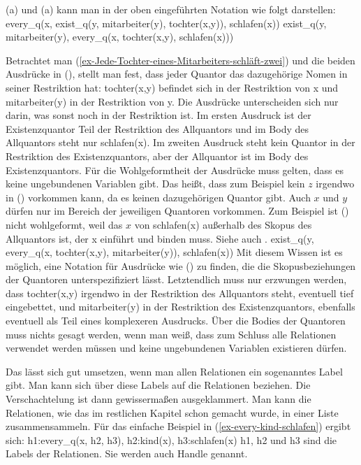 \noindent
(a) und (a) kann man in der oben eingeführten Notation wie folgt darstellen:
\eal
\label{ex-Quantoren-Mitarbeiter-Tochter}
\ex every\_q(x, exist\_q(y, mitarbeiter(y), tochter(x,y)), schlafen(x))
\ex exist\_q(y, mitarbeiter(y), every\_q(x, tochter(x,y), schlafen(x)))
\zl 

Betrachtet man (\ref{ex-Jede-Tochter-eines-Mitarbeiters-schläft-zwei}) und die beiden Ausdrücke in
(), stellt man fest, dass jeder Quantor das dazugehörige Nomen in seiner Restriktion hat:
tochter(x,y) befindet sich in der Restriktion von x und mitarbeiter(y) in der Restriktion von y. Die
Ausdrücke unterscheiden sich nur darin, was sonst noch in der Restriktion ist. Im ersten Ausdruck
ist der Existenzquantor Teil der Restriktion des Allquantors und im Body des Allquantors steht nur
schlafen(x). Im zweiten Ausdruck steht kein Quantor in der Restriktion des Existenzquantors, aber
der Allquantor ist im Body des Existenzquantors. Für die Wohlgeformtheit der Ausdrücke muss gelten,
dass es keine ungebundenen Variablen gibt. Das heißt, dass zum Beispiel kein $z$ irgendwo in
() vorkommen kann, da es keinen dazugehörigen Quantor gibt. Auch $x$ und $y$ dürfen nur im
Bereich der jeweiligen Quantoren vorkommen. Zum Beispiel ist () nicht wohlgeformt, weil das
$x$ von schlafen(x) außerhalb des Skopus des Allquantors ist, der x einführt und binden muss. Siehe
auch .
\ea
exist\_q(y, every\_q(x, tochter(x,y), mitarbeiter(y)),  schlafen(x))
\z
Mit diesem Wissen ist es möglich, eine Notation für
Ausdrücke wie () zu finden, die die Skopusbeziehungen der Quantoren unterspezifiziert
lässt. Letztendlich muss nur erzwungen werden, dass tochter(x,y) irgendwo in der Restriktion des
Allquantors steht, eventuell tief eingebettet, und mitarbeiter(y) in der Restriktion des
Existenzquantors, ebenfalls eventuell als Teil eines komplexeren Ausdrucks. Über die Bodies der
Quantoren muss nichts gesagt werden, wenn man weiß, dass zum Schluss alle Relationen verwendet
werden müssen und keine ungebundenen Variablen existieren dürfen. 

Das lässt sich gut umsetzen, wenn man allen Relationen ein sogenanntes Label gibt. Man kann sich
über diese Labels auf die Relationen beziehen. Die Verschachtelung ist dann gewissermaßen
ausgeklammert. Man kann die Relationen, wie das im restlichen Kapitel schon gemacht wurde, in einer
Liste zusammensammeln. Für das einfache Beispiel in (\ref{ex-every-kind-schlafen}) ergibt sich:
\ea
\label{ex-every-kind-schlafen-handles}
h1:every\_q(x, h2, h3), h2:kind(x), h3:schlafen(x)
\z
h1, h2 und h3 sind die Labels der Relationen. Sie werden auch Handle genannt.

